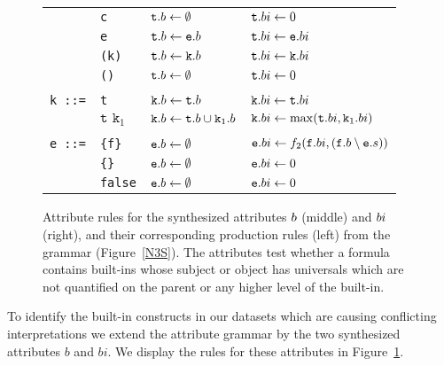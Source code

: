 \begin{figure*}
\begin{minipage}{\textwidth}
\begin{center}
\begin{tabular}{llll}
      & \texttt{c}&               $\texttt{t}.b \leftarrow \emptyset$ &               $\texttt{t}.bi \leftarrow 0$\\
      & \texttt{e}&                $\texttt{t}.b \leftarrow\texttt{e}.b $ &                $\texttt{t}.bi \leftarrow\texttt{e}.bi $ \\
      & \texttt{(k)}& $\texttt{t}.b \leftarrow\texttt{k}.b$& $\texttt{t}.bi \leftarrow\texttt{k}.bi$\\
      & \texttt{()}& $\texttt{t}.b \leftarrow \emptyset$& $\texttt{t}.bi \leftarrow 0$\\
      &&\\
\texttt{k ::=}& \texttt{t}& $\texttt{k}.b \leftarrow\texttt{t}.b$& $\texttt{k}.bi \leftarrow\texttt{t}.bi$ \\
&$\texttt{t k}_1$& $\texttt{k}.b \leftarrow \texttt{t}.b \cup \texttt{k}_1.b$ & $\texttt{k}.bi \leftarrow \max(\texttt{t}.bi, \texttt{k}_1.bi)$ \\
&&\\
\texttt{e ::=}&\texttt{\{f\}}&                $\texttt{e}.b \leftarrow \emptyset$ &                $\texttt{e}.bi \leftarrow f_2 (\texttt{f}.bi ,(\texttt{f}.b \setminus \texttt{e}.s))$\\
       &\texttt{\{\}} &  $\texttt{e}.b \leftarrow \emptyset$ &  $\texttt{e}.bi \leftarrow 0$\\
       &\texttt{false}      &                $\texttt{e}.b \leftarrow \emptyset$ &                $\texttt{e}.bi \leftarrow 0$\\
  \hline
\end{tabular}\normalsize
\caption{Attribute rules for the synthesized attributes $b$ (middle) and $bi$ (right), and their corresponding production rules (left) 
from the \nthree grammar (Figure~\ref{N3S}).
The attributes test whether a formula contains built-ins whose subject or object has universals which are not quantified on the parent or any higher level of the built-in.
\label{eval}}
\end{center}
\end{minipage}
\end{figure*}
To identify the built-in constructs in our datasets which are causing conflicting interpretations 
we extend the attribute grammar by the two synthesized attributes $b$ and $bi$. We display the rules for these attributes in Figure~\ref{eval}.

